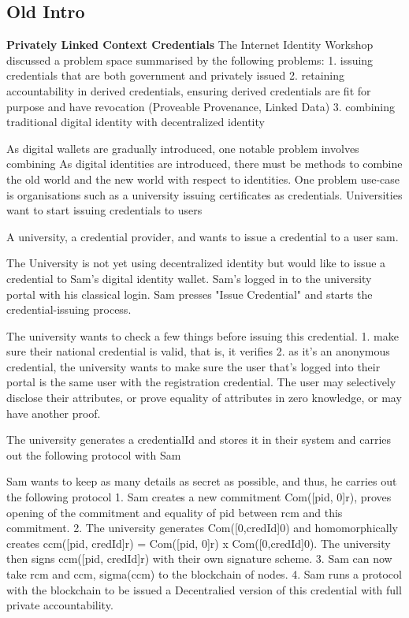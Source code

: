 \subsection{Old Intro}

\textbf{Privately Linked Context Credentials}
The Internet Identity Workshop discussed a problem space summarised by the following problems:
1. issuing credentials that are both government and privately issued
2. retaining accountability in derived credentials, ensuring derived credentials are fit for purpose and have revocation (Proveable Provenance, Linked Data)
3. combining traditional digital identity with decentralized identity




As digital wallets are gradually introduced, one notable problem involves combining 
As digital identities are introduced, there must be methods to combine the old world and the new world with respect to identities. 
One problem use-case is organisations such as a university issuing certificates as credentials. 
Universities want to start issuing credentials to users 

A university, a credential provider, and wants to issue a credential to a user sam.

The University is not yet using decentralized identity but would like to issue a credential to Sam's digital identity wallet. 
Sam's logged in to the university portal with his classical login. Sam presses "Issue Credential" and starts the credential-issuing process. 

The university wants to check a few things before issuing this credential.
1. make sure their national credential is valid, that is, it verifies
2. as it's an anonymous credential, the university wants to make sure the user that's logged into their portal is the same user with the registration credential. The user may selectively disclose their attributes, or prove equality of attributes in zero knowledge, or may have another proof.

The university generates a credentialId and stores it in their system and carries out the following protocol with Sam

Sam wants to keep as many details as secret as possible, and thus, he carries out the following protocol
1. Sam creates a new commitment Com([pid, 0]r), proves opening of the commitment and equality of pid between rcm and this commitment.
2. The university generates Com([0,credId]0) and homomorphically creates ccm([pid, credId]r) = Com([pid, 0]r) x Com([0,credId]0). The university then signs ccm([pid, credId]r) with their own signature scheme.
3. Sam can now take rcm and ccm, sigma(ccm) to the blockchain of nodes.
4. Sam runs a protocol with the blockchain to be issued a Decentralied version of this credential with full private accountability. 


